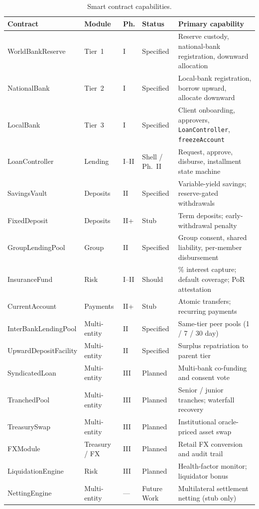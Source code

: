 \documentclass[12pt,a4paper]{report}
\newcommand{\tableheadcolor}{\rowcolor{TableHeadBg}}
\begin{document}
\begin{table}[H]
\centering
\caption[Smart contract capabilities]{Smart contract capabilities.}
\label{tab:appendix-contract-capabilities}
\footnotesize
\setlength{\tabcolsep}{3.5pt}
\renewcommand{\arraystretch}{1.08}
\begin{tabular}{@{}>{\raggedright\arraybackslash}p{2.4cm}>{\raggedright\arraybackslash}p{1.6cm}>{\centering\arraybackslash}p{0.9cm}>{\raggedright\arraybackslash}p{1.5cm}>{\raggedright\arraybackslash}p{6.2cm}@{}}
\toprule
\tableheadcolor
\textbf{Contract} & \textbf{Module} & \textbf{Ph.} & \textbf{Status} & \textbf{Primary capability} \\
\midrule
WorldBankReserve & Tier~1 & I & Specified & Reserve custody, national-bank registration, downward allocation \\
\rowcolor{RowShade}
NationalBank & Tier~2 & I & Specified & Local-bank registration, borrow upward, allocate downward \\
LocalBank & Tier~3 & I & Specified & Client onboarding, approvers, \texttt{LoanController}, \texttt{freezeAccount} \\
\rowcolor{RowShade}
LoanController & Lending & I--II & Shell / Ph.~II & Request, approve, disburse, installment state machine \\
SavingsVault & Deposits & II & Specified & Variable-yield savings; reserve-gated withdrawals \\
\rowcolor{RowShade}
FixedDeposit & Deposits & II+ & Stub & Term deposits; early-withdrawal penalty \\
GroupLendingPool & Group & II & Specified & Group consent, shared liability, per-member disbursement \\
\rowcolor{RowShade}
InsuranceFund & Risk & I--II & Should & 5\% interest capture; default coverage; PoR attestation \\
CurrentAccount & Payments & II+ & Stub & Atomic transfers; recurring payments \\
\rowcolor{RowShade}
InterBankLendingPool & Multi-entity & II & Specified & Same-tier peer pools (1 / 7 / 30 day) \\
UpwardDepositFacility & Multi-entity & II & Specified & Surplus repatriation to parent tier \\
\rowcolor{RowShade}
SyndicatedLoan & Multi-entity & III & Planned & Multi-bank co-funding and consent vote \\
TranchedPool & Multi-entity & III & Planned & Senior / junior tranches; waterfall recovery \\
\rowcolor{RowShade}
TreasurySwap & Multi-entity & III & Planned & Institutional oracle-priced asset swap \\
FXModule & Treasury / FX & III & Planned & Retail FX conversion and audit trail \\
\rowcolor{RowShade}
LiquidationEngine & Risk & III & Planned & Health-factor monitor; liquidator bonus \\
NettingEngine & Multi-entity & --- & Future Work & Multilateral settlement netting (stub only) \\
\bottomrule
\end{tabular}
\end{table}
\end{document}

